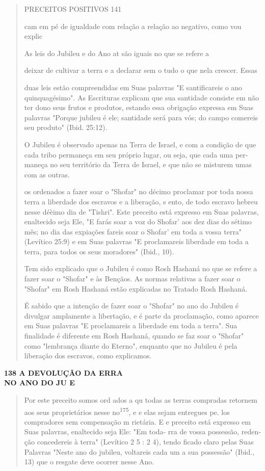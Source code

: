 \begin{quote}
PRECEITOS POSITIVOS 141

cam em pé de igualdade com relação a relação ao negativo, como vou
explic

As leis do Jubileu e do Ano at são iguais no que se refere a

deixar de cultivar a terra e a declarar sem o tudo o que nela crescer.
Essas

duas leis estão compreendidas em Suas palavras "E santificareis o ano
quinqua­gésimo". As Escrituras explicam que sua santidade consiste em
não ter dono seus frutos e produtos, estando essa obrigação expressa em
Suas palavras "Por­que jubileu é ele; santidade será para vós; do campo
comereis seu produto" (Ibid. 25:12).

O Jubileu é observado apenas na Terra de Israel, e com a condição de que
cada tribo permaneça em seu próprio lugar, ou seja, que cada uma
per­maneça no seu território da Terra de Israel, e que não se misturem
umas com as outras.

os ordenados a fazer soar o "Shofar" no décimo proclamar por toda nossa
terra a liberdade dos escravos e a liberação, s ento, de todo escravo
hebreu nesse déèimo dia de "Tishri". Este preceito está expresso em Suas
palavras, enaltecido seja Ele, "E farás soar a voz do Shofar' aos dez
dias do sétimo mês; no dia das expiações fa­reis soar o Shofar' em toda
a vossa terra" (Levítico 25:9) e em Suas palavras "E proclamareis
liberdade em toda a terra, para todos os seus moradores" (Ibid., 10).

Tem sido explicado que o Jubileu é como Rosh Hashaná no que se refere a
fazer soar o "Shofar" e às Bençãos. As normas relativas a fazer soar o
"Shofar" em Rosh Hashaná estão explicadas no Tratado Rosh Hashaná.

É sabido que a intenção de fazer soar o "Shofar" no ano do Jubileu é
divulgar amplamente a libertação, e é parte da proclamação, como aparece
em Suas palavras "E proclamareis a liberdade em toda a terra". Sua
finalidade é diferente em Rosh Hashaná, quando se faz soar o "Shofar"
como "lembrança diante do Eterno", enquanto que no Jubileu é pela
liberação dos escravos, co­mo explicamos.
\end{quote}

\textbf{138 A DEVOLUÇÃO DA ERRA\\
NO ANO DO JU E}

\begin{quote}
Por este preceito somos ord ados a qu todas as terras compradas retornem
aos seus proprietários nesse no\textsuperscript{175}, e e elas sejam
entregues pe­. los compradores sem compensação m rietária. E e preceito
está expresso em Suas palavras, enaltecido seja Ele: "Em toda- rra de
vossa possessão, reden­ção concedereis à terra" (Levítico 2 5 : 2 4),
tendo ficado claro pelas Suas Pala­vras "Neste ano do jubileu, voltareis
cada um a sua possessão" (Ibid., 13) que o resgate deve ocorrer nesse
Ano.
\end{quote}


